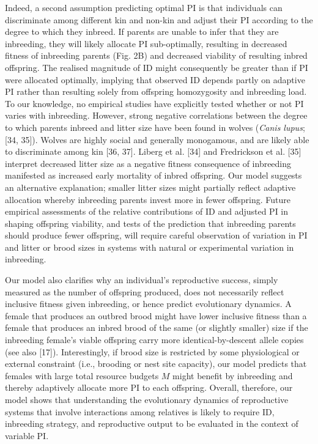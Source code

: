 \documentclass[12pt]{article}
\begin{document}
Indeed, a second assumption predicting optimal PI is that individuals can discriminate among different kin and non-kin and adjust their PI according to the degree to which they inbreed. If parents are unable to infer that they are inbreeding, they will likely allocate PI sub-optimally, resulting in decreased fitness of inbreeding parents (Fig. 2B) and decreased viability of resulting inbred offspring. The realised magnitude of ID might consequently be greater than if PI were allocated optimally, implying that observed ID depends partly on adaptive PI rather than resulting solely from offspring homozygosity and inbreeding load. To our knowledge, no empirical studies have explicitly tested whether or not PI varies with inbreeding. However, strong negative correlations between the degree to which parents inbreed and litter size have been found in wolves (\textit{Canis lupus}; [34, 35]). Wolves are highly social and generally monogamous, and are likely able to discriminate among kin [36, 37]. Liberg et al. [34] and Fredrickson et al. [35] interpret decreased litter size as a negative fitness consequence of inbreeding manifested as increased early mortality of inbred offspring. Our model suggests an alternative explanation; smaller litter sizes might partially reflect adaptive allocation whereby inbreeding parents invest more in fewer offspring. Future empirical assessments of the relative contributions of ID and adjusted PI in shaping offspring viability, and tests of the prediction that inbreeding parents should produce fewer offspring, will require careful observation of variation in PI and litter or brood sizes in systems with natural or experimental variation in inbreeding.

Our model also clarifies why an individual's reproductive success, simply measured as the number of offspring produced, does not necessarily reflect inclusive fitness given inbreeding, or hence predict evolutionary dynamics. A female that produces an outbred brood might have lower inclusive fitness than a female that produces an inbred brood of the same (or slightly smaller) size if the inbreeding female's viable offspring carry more identical-by-descent allele copies (see also [17]). Interestingly, if brood size is restricted by some physiological or external constraint (i.e., brooding or nest site capacity), our model predicts that females with large total resource budgets $M$ might benefit by inbreeding and thereby adaptively allocate more PI to each offspring. Overall, therefore, our model shows that understanding the evolutionary dynamics of reproductive systems that involve interactions among relatives is likely to require ID, inbreeding strategy, and reproductive output to be evaluated in the context of variable PI.
\end{document}
